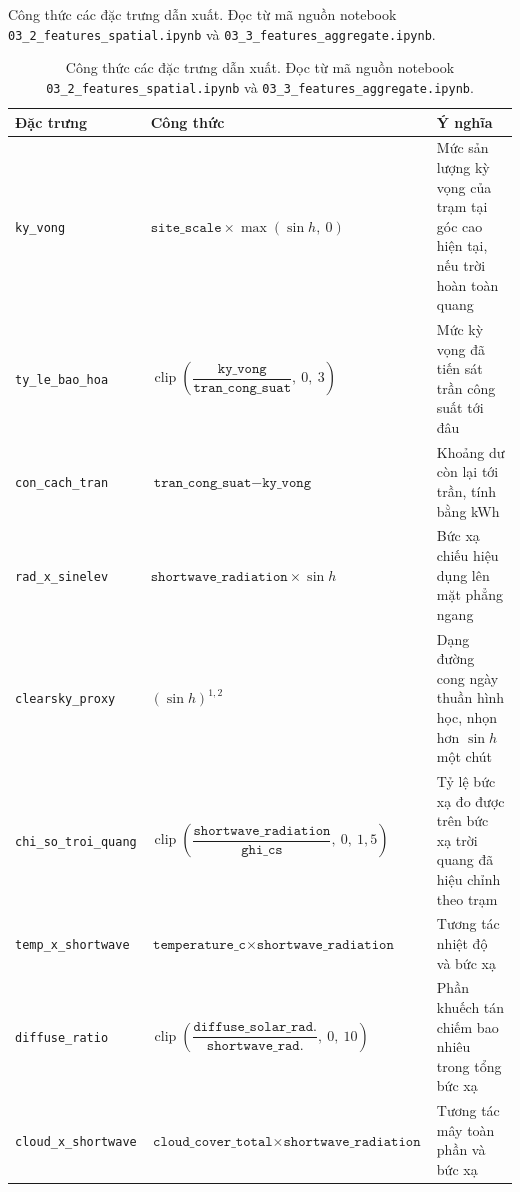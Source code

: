 \documentclass[12pt, a4paper]{report}
\begin{document}
\begin{table}[htbp]
\centering
\caption{Công thức các đặc trưng dẫn xuất. Đọc từ mã nguồn notebook
\texttt{03\_2\_features\_spatial.ipynb} và \texttt{03\_3\_features\_aggregate.ipynb}.}
\label{tab:dinh_nghia_dan_xuat}
\small
\begin{tabular}{@{}L{4.0cm} L{7.0cm} L{4.1cm}@{}}
\toprule
\textbf{Đặc trưng} & \textbf{Công thức} & \textbf{Ý nghĩa} \\
\midrule
\texttt{ky\_vong} &
$\texttt{site\_scale} \times \max(\sin h,\ 0)$ &
Mức sản lượng kỳ vọng của trạm tại góc cao hiện tại, nếu trời hoàn toàn quang \\
\addlinespace
\texttt{ty\_le\_bao\_hoa} &
$\operatorname{clip}\!\left(\dfrac{\texttt{ky\_vong}}{\texttt{tran\_cong\_suat}},\ 0,\ 3\right)$ &
Mức kỳ vọng đã tiến sát trần công suất tới đâu \\
\addlinespace
\texttt{con\_cach\_tran} &
$\texttt{tran\_cong\_suat} - \texttt{ky\_vong}$ &
Khoảng dư còn lại tới trần, tính bằng kWh \\
\addlinespace
\texttt{rad\_x\_sinelev} &
$\texttt{shortwave\_radiation} \times \sin h$ &
Bức xạ chiếu hiệu dụng lên mặt phẳng ngang \\
\addlinespace
\texttt{clearsky\_proxy} &
$(\sin h)^{1{,}2}$ &
Dạng đường cong ngày thuần hình học, nhọn hơn $\sin h$ một chút \\
\addlinespace
\texttt{chi\_so\_troi\_quang} &
$\operatorname{clip}\!\left(\dfrac{\texttt{shortwave\_radiation}}{\texttt{ghi\_cs}},\ 0,\ 1{,}5\right)$ &
Tỷ lệ bức xạ đo được trên bức xạ trời quang đã hiệu chỉnh theo trạm \\
\addlinespace
\texttt{temp\_x\_shortwave} &
$\texttt{temperature\_c} \times \texttt{shortwave\_radiation}$ &
Tương tác nhiệt độ và bức xạ \\
\addlinespace
\texttt{diffuse\_ratio} &
$\operatorname{clip}\!\left(\dfrac{\texttt{diffuse\_solar\_rad.}}{\texttt{shortwave\_rad.}},\ 0,\ 10\right)$ &
Phần khuếch tán chiếm bao nhiêu trong tổng bức xạ \\
\addlinespace
\texttt{cloud\_x\_shortwave} &
$\texttt{cloud\_cover\_total} \times \texttt{shortwave\_radiation}$ &
Tương tác mây toàn phần và bức xạ \\
\bottomrule
\end{tabular}
\caption[Công thức các đặc trưng dẫn xuất]{Công thức các đặc trưng dẫn xuất. Đọc từ mã nguồn notebook
\texttt{03\_2\_features\_spatial.ipynb} và \texttt{03\_3\_features\_aggregate.ipynb}.}
\label{tab:dinh_nghia_dan_xuat}
\end{table}
\end{document}

